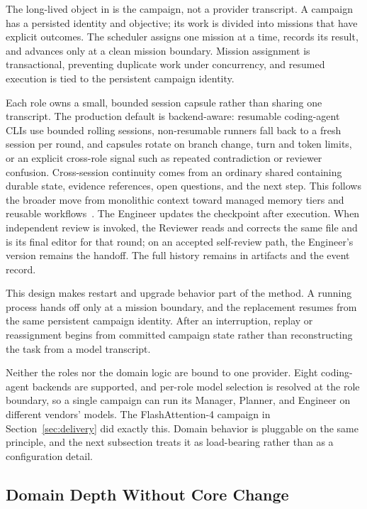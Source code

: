 The long-lived object in \systemname is the campaign, not a provider transcript. A
campaign has a persisted identity and objective; its work is divided into missions
that have explicit outcomes. The scheduler assigns one mission at a time, records
its result, and advances only at a clean mission boundary. Mission assignment is
transactional, preventing duplicate work under concurrency, and resumed execution
is tied to the persistent campaign identity.

Each role owns a small, bounded session capsule rather than sharing one transcript.
The production default is backend-aware: resumable coding-agent CLIs use bounded
rolling sessions, non-resumable runners fall back to a fresh session per round, and
capsules rotate on branch change, turn and token limits, or an explicit cross-role
signal such as repeated contradiction or reviewer confusion. Cross-session
continuity comes from an ordinary shared  containing durable
state, evidence references, open questions, and the next step. This follows the
broader move from monolithic context toward managed memory tiers and reusable
workflows~\citep{packer2023memgpt,wang2024workflowmemory,xu2025amem}. The Engineer
updates the checkpoint after execution. When independent review is invoked, the
Reviewer reads and corrects the same file and is its final editor for that round;
on an accepted self-review path, the Engineer's version remains the handoff. The
full history remains in artifacts and the event record.

This design makes restart and upgrade behavior part of the method. A running process
hands off only at a mission boundary, and the replacement resumes from the same
persistent campaign identity. After an interruption, replay or reassignment begins
from committed campaign state rather than reconstructing the task from a model
transcript.

Neither the roles nor the domain logic are bound to one provider. Eight coding-agent
backends are supported, and per-role model selection is resolved at the role
boundary, so a single campaign can run its Manager, Planner, and Engineer on
different vendors' models. The FlashAttention-4 campaign in
Section~\ref{sec:delivery} did exactly this. Domain behavior is pluggable on the same
principle, and the next subsection treats it as load-bearing rather than as a
configuration detail.

\subsection{Domain Depth Without Core Change}
\label{sec:vertical-core}


